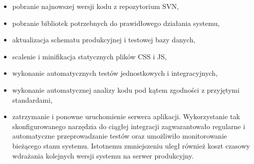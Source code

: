 \begin{itemize}
\item pobranie najnowszej wersji kodu z repozytorium SVN,
\item pobranie bibliotek potrzebnych do prawidłowego działania systemu,
\item aktualizacja schematu produkcyjnej i testowej bazy danych,
\item scalenie i minifikacja statycznych plików CSS i JS,
\item wykonanie automatycznych testów jednostkowych i integracyjnych,
\item wykonanie automatycznej analizy kodu pod kątem zgodności z przyjętymi standardami,
\item zatrzymanie i ponowne uruchomienie serwera aplikacji.
Wykorzystanie tak skonfigurowanego narzędzia do ciągłej integracji zagwarantowało regularne i automatyczne przeprowadzanie testów oraz umożliwiło monitorowanie bieżącego stanu systemu. Istotnemu zmniejszeniu uległ również koszt czasowy wdrażania kolejnych wersji systemu na serwer produkcyjny.
\end{itemize}